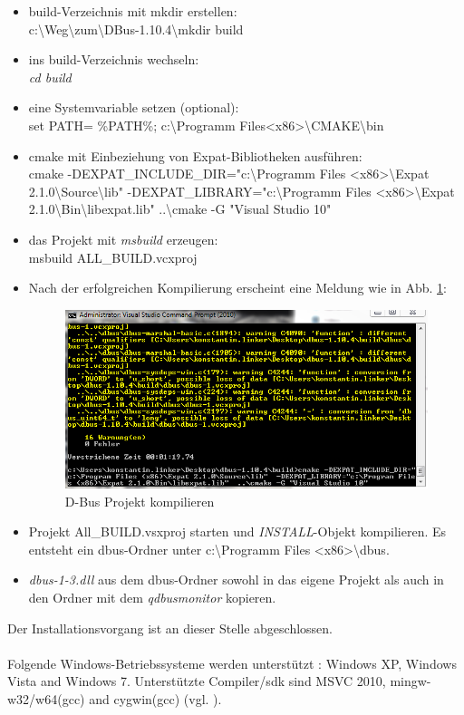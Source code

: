 \begin{itemize}
	\setlength{\itemsep}{-10pt}
	\item build-Verzeichnis mit mkdir erstellen: \\ c:\textbackslash Weg\textbackslash zum\textbackslash DBus-1.10.4\textbackslash mkdir build
	\item ins build-Verzeichnis wechseln:\\ \textit{cd build}
	\item eine Systemvariable setzen (optional):\\
	set PATH= \%PATH\%; c:\textbackslash Programm Files<x86>\textbackslash CMAKE\textbackslash bin
	\item cmake mit Einbeziehung von Expat-Bibliotheken ausführen:\\
	cmake -DEXPAT\_INCLUDE\_DIR="c:\textbackslash Programm Files <x86>\textbackslash Expat 2.1.0\textbackslash Source\textbackslash lib"\- -DEXPAT\_LIBRARY="c:\textbackslash Programm Files <x86>\textbackslash Expat 2.1.0\textbackslash Bin\textbackslash libexpat.lib" ..\textbackslash cmake -G "Visual Studio 10"
	\item das Projekt mit \textit{msbuild} erzeugen:\\ 
	msbuild ALL\_BUILD.vcxproj 
	\item Nach der erfolgreichen Kompilierung erscheint eine Meldung wie in Abb. \ref{fig:dbusBuild}:
	\begin{figure}[H]
		\centering
		\includegraphics[width=1\linewidth]{images/dbusBuild}
		\caption[D-Bus Projekt kompilieren]{D-Bus Projekt kompilieren}
		\label{fig:dbusBuild}
	\end{figure}
	\item Projekt All\_BUILD.vsxproj starten und \textit{INSTALL}-Objekt kompilieren. Es entsteht ein dbus-Ordner unter c:\textbackslash Programm Files <x86>\textbackslash dbus. 
	\item \textit{dbus-1-3.dll} aus dem dbus-Ordner sowohl in das eigene Projekt als auch in den Ordner mit dem \textit{qdbusmonitor} kopieren.
\end{itemize}  
Der Installationsvorgang ist an dieser Stelle abgeschlossen.\\\\
Folgende Windows-Betriebssysteme werden unterstützt : Windows XP, Windows Vista and Windows 7. Unterstützte Compiler/sdk sind MSVC 2010, mingw-w32/w64(gcc) and cygwin(gcc) (vgl. \cite[Web]{freedesktop2015}).
